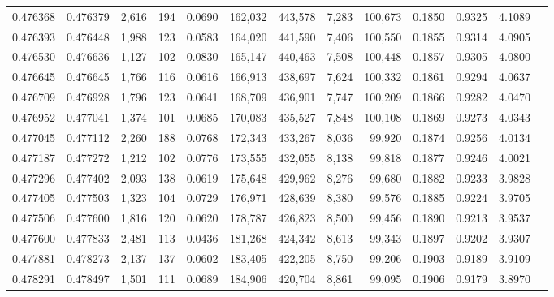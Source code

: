 \begin{tabular}{rrrrrrrrrrrrr}
0.476368 & 0.476379 & 2,616 &   194 &                                     0.0690 & 162,032 & 443,578 &   7,283 & 100,673 & 0.1850 & 0.9325 & 4.1089 \\
0.476393 & 0.476448 & 1,988 &   123 &                                     0.0583 & 164,020 & 441,590 &   7,406 & 100,550 & 0.1855 & 0.9314 & 4.0905 \\
0.476530 & 0.476636 & 1,127 &   102 &                                     0.0830 & 165,147 & 440,463 &   7,508 & 100,448 & 0.1857 & 0.9305 & 4.0800 \\
0.476645 & 0.476645 & 1,766 &   116 &                                     0.0616 & 166,913 & 438,697 &   7,624 & 100,332 & 0.1861 & 0.9294 & 4.0637 \\
0.476709 & 0.476928 & 1,796 &   123 &                                     0.0641 & 168,709 & 436,901 &   7,747 & 100,209 & 0.1866 & 0.9282 & 4.0470 \\
0.476952 & 0.477041 & 1,374 &   101 &                                     0.0685 & 170,083 & 435,527 &   7,848 & 100,108 & 0.1869 & 0.9273 & 4.0343 \\
0.477045 & 0.477112 & 2,260 &   188 &                                     0.0768 & 172,343 & 433,267 &   8,036 &  99,920 & 0.1874 & 0.9256 & 4.0134 \\
0.477187 & 0.477272 & 1,212 &   102 &                                     0.0776 & 173,555 & 432,055 &   8,138 &  99,818 & 0.1877 & 0.9246 & 4.0021 \\
0.477296 & 0.477402 & 2,093 &   138 &                                     0.0619 & 175,648 & 429,962 &   8,276 &  99,680 & 0.1882 & 0.9233 & 3.9828 \\
0.477405 & 0.477503 & 1,323 &   104 &                                     0.0729 & 176,971 & 428,639 &   8,380 &  99,576 & 0.1885 & 0.9224 & 3.9705 \\
0.477506 & 0.477600 & 1,816 &   120 &                                     0.0620 & 178,787 & 426,823 &   8,500 &  99,456 & 0.1890 & 0.9213 & 3.9537 \\
0.477600 & 0.477833 & 2,481 &   113 &                                     0.0436 & 181,268 & 424,342 &   8,613 &  99,343 & 0.1897 & 0.9202 & 3.9307 \\
0.477881 & 0.478273 & 2,137 &   137 &                                     0.0602 & 183,405 & 422,205 &   8,750 &  99,206 & 0.1903 & 0.9189 & 3.9109 \\
0.478291 & 0.478497 & 1,501 &   111 &                                     0.0689 & 184,906 & 420,704 &   8,861 &  99,095 & 0.1906 & 0.9179 & 3.8970 \\

\end{tabular}

